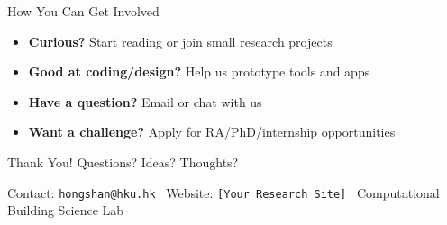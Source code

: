 \documentclass{beamer}
\begin{document}
\begin{frame}{How You Can Get Involved}
  \begin{itemize}
    \item \textbf{Curious?} Start reading or join small research projects
    \item \textbf{Good at coding/design?} Help us prototype tools and apps
    \item \textbf{Have a question?} Email or chat with us
    \item \textbf{Want a challenge?} Apply for RA/PhD/internship opportunities
  \end{itemize}
\end{frame}

\begin{frame}{Thank You!}
  \Large Questions? Ideas? Thoughts?
  \vspace{2em}

  \small
  Contact: \texttt{hongshan@hku.hk} \
  Website: \texttt{[Your Research Site]} \
  Computational Building Science Lab
\end{frame}
\end{document}
